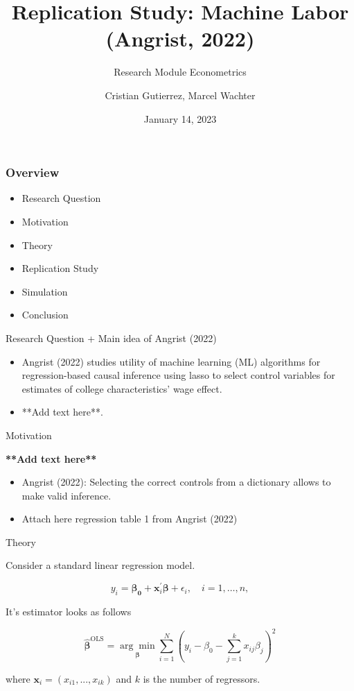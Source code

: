 \documentclass{beamer}
\title{Replication Study: Machine Labor (Angrist, 2022)}
\subtitle {Research Module Econometrics}
\author{Cristian Gutierrez, Marcel Wachter}
\date{January 14, 2023}
\begin{document}
\maketitle

\begin{frame}
\frametitle{Overview} 

\begin{itemize}
    

\item Research Question
\item Motivation
\item Theory
\item Replication Study
\item Simulation
\item Conclusion
\end{itemize}
\end{frame}


\begin{frame} {Research Question + Main idea of Angrist (2022)}
\begin{itemize}

\item  Angrist (2022) studies utility of machine learning (ML) algorithms for regression-based causal inference using lasso to select control variables for estimates of college characteristics' wage effect.
\item **Add text here**.
\end{itemize}

\end{frame}






\begin{frame}{Motivation}

\flushleft \textbf{**Add text here**}
\vspace{4mm}
\begin{itemize}
    \item Angrist (2022): Selecting the correct controls from a dictionary allows to make valid inference.
    \item Attach here regression table 1 from Angrist (2022)
\end{itemize}

\end{frame}


\begin{frame}{Theory}
\begin{flushleft}
\item Consider a standard linear regression model. 
\end{flushleft}
\[
    y_i=\boldsymbol{\beta_0} +\mathbf{x}_i^\prime \boldsymbol{\beta}+\epsilon_i, \quad i = 1, \ldots, n,
    \tag{1}
\]
\begin{flushleft}
It's estimator looks as follows
\end{flushleft}
\[
\hat{\boldsymbol{\beta}}^{\text{OLS}}=\underset{\boldsymbol{\beta}}{\arg \min}\sum_{i=1}^N (y_i-\beta_0-\sum_{j=1}^k x_{i j}\beta_j)^2
    \tag{2}
\]
\begin{flushleft}
where $\mathbf{x}_i=(x_{i1}, ..., x_{ik})$ and $k$ is the number of regressors.
\end{flushleft}
\end{frame}
\end{document}
